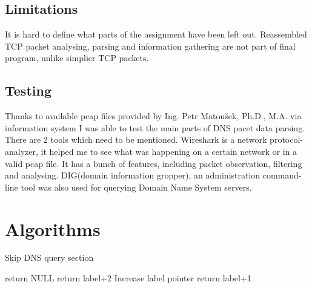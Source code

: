 \documentclass[11pt,a4paper]{article}
\begin{document}
\subsection{Limitations}
\label{LIMITATIONS}
It is hard to define what parts of the assignment have been left out. Reassembled TCP packet analysing, parsing and information gathering are not part of final program, unlike simplier TCP packets.

\subsection{Testing}
\label{TESTING}
Thanks to available pcap files provided by Ing. Petr Matoušek, Ph.D., M.A. via information system I was able to test the main parts of DNS pacet data parsing. There are 2 tools which need to be mentioned. Wireshark is a network protocol-analyzer, it helped me to see what was happening on a certain network or in a valid pcap file. It has a bunch of features, including packet observation, filtering and analysing. DIG(domain information gropper), an administration command-line tool was also used for querying Domain Name System servers.


\section{Algorithms}
\label{ALGORITHMS}

\label{skipDNSQuery}
\begin{algorithm}
    \caption{Skip DNS query section}
    \begin{algorithmic}

            \State return NULL
        \EndIf
            \State return label+2
        \EndIf
            \State Increase label pointer
        \EndWhile
    \EndProcedure
    \State return label+1
    \end{algorithmic}
\end{algorithm}
\end{document}
